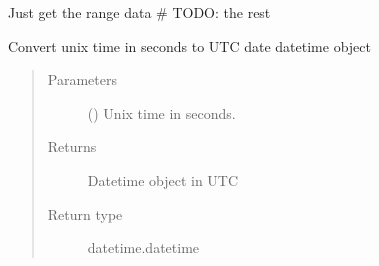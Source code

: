 \documentclass[letterpaper,10pt,english]{sphinxmanual}
\begin{document}

\begin{fulllineitems}
\label{\detokenize{modules/ccsds_write:ccsds_write.read_ccsds}}
Just get the range data \# TODO: the rest

\end{fulllineitems}


\begin{fulllineitems}
\label{\detokenize{modules/ccsds_write:ccsds_write.unix2date}}
Convert unix time in seconds to UTC date datetime object
\begin{quote}\begin{description}
\item[{Parameters}] \leavevmode
{} () \textendash{} Unix time in seconds.

\item[{Returns}] \leavevmode
Datetime object in UTC

\item[{Return type}] \leavevmode
datetime.datetime

\end{description}\end{quote}

\end{fulllineitems}

\end{document}
